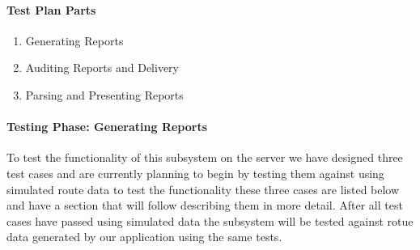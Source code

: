 \documentclass{article}
\begin{document}
\paragraph{Test Plan Parts}
\begin{enumerate}
\item Generating Reports
\item Auditing Reports and Delivery
\item Parsing and Presenting Reports
\end{enumerate}


\paragraph{Testing Phase: Generating Reports}
To test the functionality of this subsystem on the server we have designed three test cases and are currently planning to begin by testing them against using simulated route data to test the functionality these three cases are listed below and have a section that will follow describing them in more detail. After all test cases have passed using simulated data the subsystem will be tested against rotue data generated by our application using the same tests. 
\end{document}
